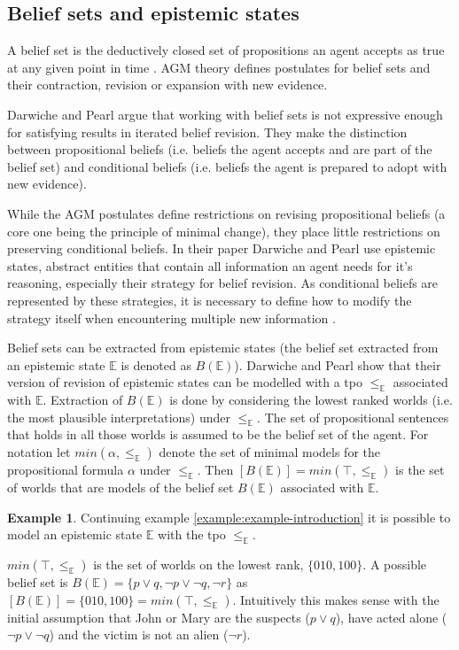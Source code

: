 \documentclass[11pt]{scrartcl}
\theoremstyle{definition}
\newtheorem{example}{Example}[section]
\theoremstyle{definition}
\begin{document}
\subsection{Belief sets and epistemic states}
A belief set is the deductively closed set of propositions an agent accepts as true at any given point in time \cite{Ferme2011}. AGM theory \cite{Alchourron1985} defines postulates for belief sets and their contraction, revision or expansion with new evidence.

Darwiche and Pearl \cite{Darwiche1997} argue that working with belief sets is not expressive enough for satisfying results in iterated belief revision. They make the distinction between propositional beliefs (i.e. beliefs the agent accepts and are part of the belief set) and conditional beliefs (i.e. beliefs the agent is prepared to adopt with new evidence).

While the AGM postulates define restrictions on revising propositional beliefs (a core one being the principle of minimal change), they place little restrictions on preserving conditional beliefs. In their paper Darwiche and Pearl use epistemic states, abstract entities that contain all information an agent needs for it's reasoning, especially their strategy for belief revision. As conditional beliefs are represented by these strategies, it is necessary to define how to modify the strategy itself when encountering multiple new information \cite{Darwiche1997}.

Belief sets can be extracted from epistemic states (the belief set extracted from an epistemic state $\mathbb{E}$ is denoted as $B(\mathbb{E})$). Darwiche and Pearl show that their version of revision of epistemic states can be modelled with a tpo $\leq_{\mathbb{E}}$ associated with $\mathbb{E}$. Extraction of $B(\mathbb{E})$ is done by considering the lowest ranked worlds (i.e. the most plausible interpretations) under $\leq_{\mathbb{E}}$. The set of propositional sentences that holds in all those worlds is assumed to be the belief set of the agent. For notation let $min(\alpha, \leq_{\mathbb{E}})$ denote the set of minimal models for the propositional formula $\alpha$ under $\leq_{\mathbb{E}}$. Then $[B(\mathbb{E})] = min(\top, \leq_{\mathbb{E}})$ is the set of worlds that are models of the belief set $B(\mathbb{E})$ associated with $\mathbb{E}$.

\begin{example}
    Continuing example \ref{example:example-introduction} it is possible to model an epistemic state $\mathbb{E}$ with the tpo $\leq_{\mathbb{E}}$.
    
    $min(\top, \leq_{\mathbb{E}})$ is the set of worlds on the lowest rank, $\{010, 100\}$. A possible belief set is $B(\mathbb{E}) = \{p \vee q, \neg p \vee \neg q, \neg r\}$ as $[B(\mathbb{E})] = \{010, 100\} = min(\top, \leq_{\mathbb{E}})$. Intuitively this makes sense with the initial assumption that John or Mary are the suspects ($p \vee q$), have acted alone ($\neg p \vee \neg q$) and the victim is not an alien ($\neg r$).
\end{example}
\end{document}
